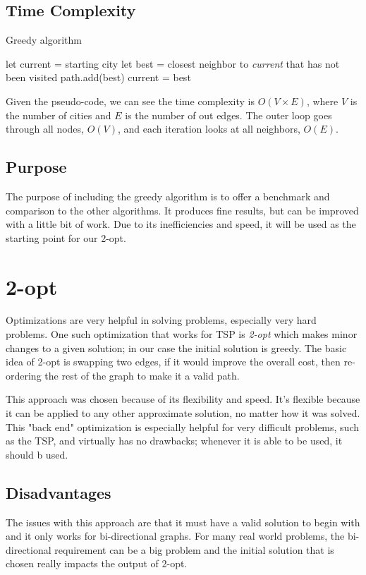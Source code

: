 \documentclass[12pt]{report}
\begin{document}
\newpage
\subsection{Time Complexity}
\begin{algorithm}
\caption{Greedy algorithm}
\label{Greedy_Alg}
\begin{algorithmic}[1]
    \State let current = starting city
    \State let best = closest neighbor to \textit{current} that has not been visited
    \State path.add(best)
    \State current = best
    \EndWhile
\EndProcedure
\end{algorithmic}
\end{algorithm}

\begin{multicols}{2}
    Given the pseudo-code, we can see the time complexity is $O(V \times E)$, where $V$ is the number of cities and $E$ is the number of out edges. The outer loop goes through all nodes, $O(V)$, and each iteration looks at all neighbors, $O(E)$.
    \subsection{Purpose}
    The purpose of including the greedy algorithm is to offer a benchmark and comparison to the other algorithms. It produces fine results, but can be improved with a little bit of work. Due to its inefficiencies and speed, it will be used as the starting point for our 2-opt.

    \section{2-opt}
    Optimizations are very helpful in solving problems, especially very hard problems. One such optimization that works for TSP is \textit{2-opt} which makes minor changes to a given solution; in our case the initial solution is greedy. The basic idea of 2-opt is swapping two edges, if it would improve the overall cost, then re-ordering the rest of the graph to make it a valid path.

    This approach was chosen because of its flexibility and speed. It's flexible because it can be applied to any other approximate solution, no matter how it was solved. This "back end" optimization is especially helpful for very difficult problems, such as the TSP, and virtually has no drawbacks; whenever it is able to be used, it should b used.
    \subsection{Disadvantages}
    The issues with this approach are that it must have a valid solution to begin with and it only works for bi-directional graphs. For many real world problems, the bi-directional requirement can be a big problem and the initial solution that is chosen really impacts the output of 2-opt.

\end{multicols}
\end{document}
